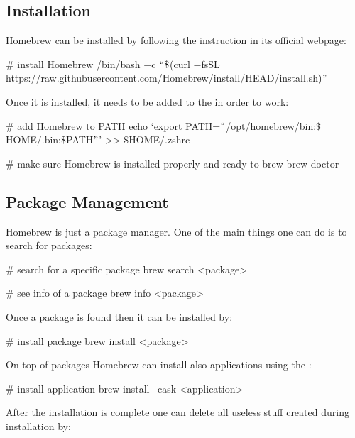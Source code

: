 \subsection{Installation}
Homebrew can be installed by following the instruction in its \href{https://brew.sh}{official webpage}:

\begin{bash}
# install Homebrew
/bin/bash $-$c $``\$$(curl $-$fsSL https://raw.githubusercontent.com/Homebrew/install/HEAD/install.sh)$"$
\end{bash}

Once it is installed, it needs to be added to the  in order to work:

\begin{bash}
# add Homebrew to PATH
echo `export PATH=$``$/opt/homebrew/bin:$\$${HOME}/.bin:$\$$PATH$"$' >> $\$$HOME/.zshrc
\end{bash}

\begin{bash}
# make sure Homebrew is installed properly and ready to brew
brew doctor
\end{bash}

\subsection{Package Management}
Homebrew is just a package manager. One of the main things one can do is to search for packages:

\begin{bash}
# search for a specific package
brew search <package>
\end{bash}

\begin{bash}
# see info of a package
brew info <package>
\end{bash}

Once a package is found then it can be installed by:

\begin{bash}
# install package
brew install <package>
\end{bash}

On top of packages Homebrew can install also applications using the :

\begin{bash}
# install application
brew install --cask <application>
\end{bash}

After the installation is complete one can delete all useless stuff created during installation by:

